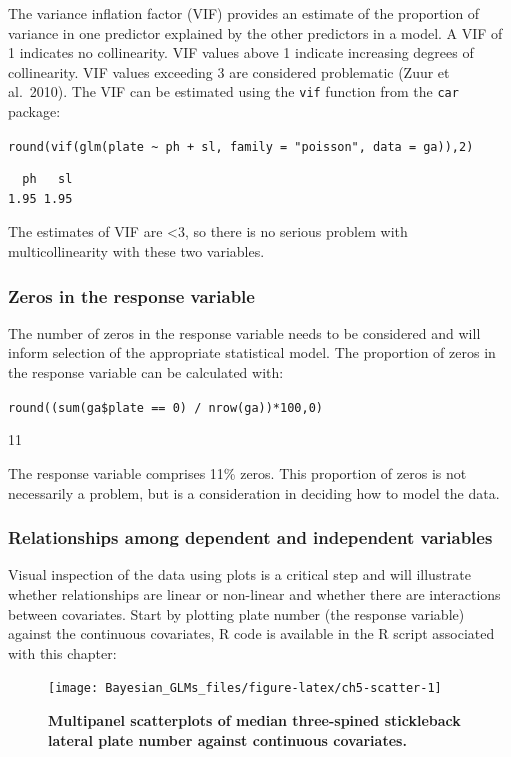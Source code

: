\documentclass[
]{book}
\begin{document}
The variance inflation factor (VIF) provides an estimate of the proportion of variance in one predictor explained by the other predictors in a model. A VIF of 1 indicates no collinearity. VIF values above 1 indicate increasing degrees of collinearity. VIF values exceeding 3 are considered problematic (Zuur et al.~2010). The VIF can be estimated using the \texttt{vif} function from the \texttt{car} package:

\texttt{round(vif(glm(plate\ \textasciitilde{}\ ph\ +\ sl,\ family\ =\ "poisson",\ data\ =\ ga)),2)}

\begin{verbatim}
  ph   sl 
1.95 1.95 
\end{verbatim}

The estimates of VIF are \textless3, so there is no serious problem with multicollinearity with these two variables.

\hypertarget{pois-zeros}{%
\subsubsection{Zeros in the response variable}\label{pois-zeros}}

The number of zeros in the response variable needs to be considered and will inform selection of the appropriate statistical model. The proportion of zeros in the response variable can be calculated with:

\texttt{round((sum(ga\$plate\ ==\ 0)\ /\ nrow(ga))*100,0)}

11

The response variable comprises 11\% zeros. This proportion of zeros is not necessarily a problem, but is a consideration in deciding how to model the data.

\hypertarget{pois-rels}{%
\subsubsection{Relationships among dependent and independent variables}\label{pois-rels}}

Visual inspection of the data using plots is a critical step and will illustrate whether relationships are linear or non-linear and whether there are interactions between covariates. Start by plotting plate number (the response variable) against the continuous covariates, R code is available in the R script associated with this chapter:



\begin{figure}

{\centering \texttt{[image: Bayesian\_GLMs\_files/figure-latex/ch5-scatter-1]} 

}

\caption{\textbf{Multipanel scatterplots of median three-spined stickleback lateral plate number against continuous covariates.}}\label{fig:ch5-scatter}
\end{figure}
\end{document}

